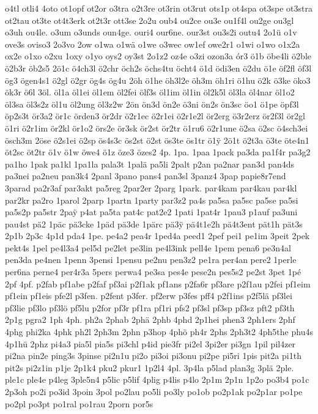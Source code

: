 {o4tl
otli4
4oto
ot1opf
ot2or
o3tra
o2t3re
ot3rin
ot3rut
ots1p
ot4spa
ot3spe
ot3stra
ot2tau
ot3te
ot4t3erk
ot2t3r
ott3se
2o2u
oub4
ou2ce
ou3e
ou1f4l
ou2ge
ou3gl
o3uh
ou4le.
o3um
o3unds
oun4ge.
ouri4
our6ne.
our3st
ou3s2i
outu4
2o1ü
o1v
ove3s
oviso3
2o3vo
2ow
o1wa
o1wä
o1we
o3wec
ow1ef
owe2r1
o1wi
o1wo
o1x2a
ox2e
o1xo
o2xu
1oxy
o1yo
oys2
oy3st
2o1z2
oz4e
o3zi
ozon3a
ór3
ö1b
öbe4li
ö2ble
ö2b3r
öb2s5
2ö1c
ö4ch3l
ö2chr
öch2s
öchs4tu
öcht4
ö1d
ödi3en
ö2du
ö1e
öf2fl
öf3l
ög3
ögen4s1
ö2gl
ö2gr
ög4s
ög4u
2öh
ö1he
öh3l2e
öh3m
öh1ri
ö1hu
ö2k
ö3ke
öko3
ök3r
ö6l
3öl.
öl1a
öl1ei
öl1em
öl2fei
ölf3s
öl1im
öl1in
öl2k5l
öl3la
öl4nar
öl1o2
öl3sa
öl3s2z
öl1u
öl2ung
öl3z2w
2ön
ön3d
ön2e
ö3ni
ön2s
ön3sc
öo1
ö1pe
öpf3l
öp2s3t
ör3a2
ör1c
örden3
ör2dr
ö2r1ec
ö2r1ei
ö2r1e2l
ör2erg
ö3r2erz
ör2f3l
ör2gl
ö1ri
ö2r1im
ör2kl
ör1o2
örs2e
ör3sk
ör2st
ör2tr
ö1ru6
ö2r1une
ö2sa
ö2sc
ö4sch3ei
ösch3m
2öse
ö2s1ei
ö2sp
ös4s3c
ös2st
ö2st
ös3te
ös1tr
ö1^^ff
2ö1t
ö2t3a
ö3te
öte4n1
öt2sc
öt2tr
ö1v
ö1w
öwe4
ö1z
öze3
özes2
4p.
1pa.
1paa
1pack
pa3da
pa1f4r
pa3g2
pa1ho
1pak
pa1kl
1pa1la
pala3t
1palä
pa5li
2palt
p2an
pa2nar
pan3d
pan4ds
pa3nei
pa2neu
pan3k4
2panl
3pano
pans4
pan3sl
3panz4
3pap
papie8r7end
3parad
pa2r3af
par3akt
pa5reg
2par2er
2parg
1park.
par4kam
par4kau
par4kl
par2kr
pa2ro
1parol
2parp
1partn
1party
par3z2
pa4s
pa5sa
pa5sc
pa5se
pa5si
pa5s2p
pa5str
2pa^^ff
p4at
pa5ta
pat4c
pat2e2
1pati
1pat4r
1pau3
p1auf
pa3uni
pau4st
pä2
1päc
pä3cke
1päd
pä3de
1pärc
pä3^^ff
pä4t1e2h
pä4t3ent
pät1h
pät3s
2p1b
2p3c
4p1d
pda4
1pe.
pe4a2
pea4r
1ped4a
peed1
2pef
pei1
pe1im
3peit
2pek
pekt4s
1pel
pe4l3a4
pel5d
pe2let
pe3lin
pe4l3ink
pell4e
1pem
pena6
pe3n4al
pen3da
pe4nen
1penn
3pensi
1pensu
pe2nu
pen3z2
pe1ra
per4an
pere2
1perle
per6na
perne4
per4r3a
5pers
perwa4
pe3sa
pes4e
pese2n
pes5s2
pe2st
3pet
1pé
2pf
4pf.
p2fab
pf1abe
p2faf
pf3ai
p2f1ak
pf1ans
p2fa6r
pf3are
p2f1au
p2fei
pf1eim
pf1ein
pf1eis
pfe2l
p3fen.
p2fent
p3fer.
pf2erw
p3fes
pff4
p2f1ins
p2f5lä
pf3lei
pf3lie
pf3lo
pf3lö
pf5lu
p2for
pf3r
pf1ra
pf1ri
pfs2
pf3sl
pf3sp
pf3sz
pft2
pf3th
2p1g
pgra2
1ph
4ph.
ph2a
2phab
2phä
2phb
4phd
2p1hei
phen3
2ph1ers
2phf
4phg
phi2ka
4phk
ph2l
2ph3m
2phn
p3hop
4phö
ph4r
2phs
2ph3t2
4ph5the
phu4s
4p1hü
2phz
pi4a3
pia5l
pia5s
pi3chl
p4id
pie3fr
pi2el
3pi2er
pi3gn
1pil
pil4zer
pi2na
pin2e
ping3s
3pinse
pi2n1u
pi2o
pi3oi
pi3onu
pi2pe
pi5ri
1pis
pit2a
pi1th
pit2s
pi2z1in
p1je
2p1k4
pku2
pkur1
1p2l4
4pl.
3p4la
p5lad
plan3g
3plä
2ple.
ple1c
ple4e
p4leg
3ple5n4
p5lic
p5lif
4plig
p4lis
p4lo
2p1m
2p1n
1p2o
po3b4
po1c
2p3oh
po2i
po3id
3poin
3pol
po2lau
po5li
po3ly
po1ob
po2p1ak
po2p1ar
po1pe
po2pl
po3pt
po1ral
po1rau
2porn
por5s
}

